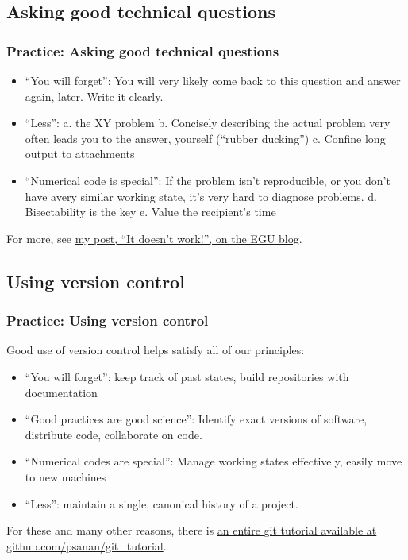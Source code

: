 \documentclass{beamer}
\begin{document}
\subsection{Asking good technical questions}
\begin{frame}[fragile]
\frametitle{Practice: Asking good technical questions}
  \begin{itemize}
    \item ``You will forget'': You will very likely come back to this question and answer again, later. Write it clearly.

\item ``Less'':
  a. the XY problem
      b. Concisely describing the actual problem very often leads you to the answer, yourself (``rubber ducking'')
  c. Confine long output to attachments
\item ``Numerical code is special'': If the problem isn't reproducible, or you don't have  avery similar working state, it's very hard to diagnose problems.
  d. Bisectability is the key
  e. Value the recipient's time
  \end{itemize}

  For more, see \href{https://blogs.egu.eu/divisions/gd/2019/07/03/it-doesnt-work-asking-questions-about-scientific-software/}{my post, ``It doesn't work!'', on the EGU blog}.
\end{frame}

\subsection{Using version control}
\begin{frame}[fragile]
\frametitle{Practice: Using version control}
Good use of version control helps satisfy all of our principles:
  \begin{itemize}
    \item ``You will forget'': keep track of past states, build repositories with documentation
    \item ``Good practices are good science'': Identify exact versions of software, distribute code, collaborate on code.
    \item ``Numerical codes are special'': Manage working states effectively, easily move to new machines
    \item ``Less'': maintain a single, canonical history of a project.
  \end{itemize}
  For these and many other reasons, there is \href{https://github.com/psanan/git_tutorial}{an entire git tutorial available at github.com/psanan/git\_tutorial}.
\end{frame}
\end{document}
